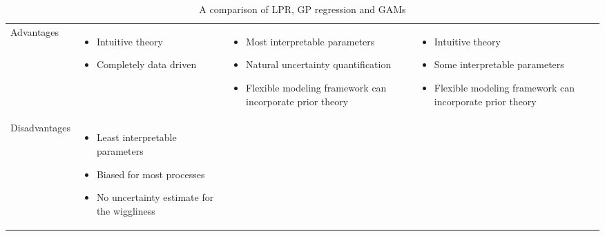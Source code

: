 \documentclass[man, floatsintext]{apa7}
\begin{document}
\begin{table}[htbp]
  \begin{center}
    \begin{threeparttable}
      \caption{A comparison of LPR, GP regression and GAMs}
      \label{tab:meth_sum}
      \begin{singlespace}
        \begin{tabularx}{\linewidth}
          {>{\raggedright}s
            >{\raggedright}X
            >{\raggedright}X
            >{\raggedright\arraybackslash}X}
          \toprule
                                                                         &
                                                  &
                                                   &
          \\
          \midrule
          Advantages                                                     &
          \begin{itemize}
            \item Intuitive theory
            \item Completely data driven
          \end{itemize}                                   &
          \begin{itemize}
            \item Most interpretable parameters
            \item Natural uncertainty quantification
            \item Flexible modeling framework can incorporate prior theory
          \end{itemize} &
          \begin{itemize}
            \item Intuitive theory
            \item Some interpretable parameters
            \item Flexible modeling framework can incorporate prior theory
          \end{itemize}
          \\ \midrule
          Disadvantages                                                  &
          \begin{itemize}
            \item Least interpretable parameters
            \item Biased for most processes
            \item No uncertainty estimate for the wiggliness

\end{itemize}
\end{tabularx}
\end{singlespace}
\end{threeparttable}
\end{center}
\end{table}
\end{document}
